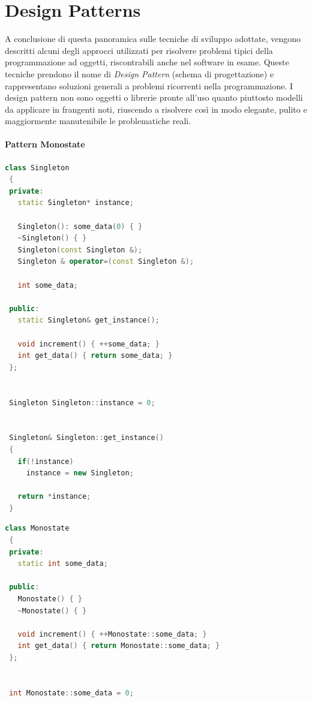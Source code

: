 \section{Design Patterns}
A conclusione di questa panoramica sulle tecniche di sviluppo adottate, vengono descritti alcuni degli approcci utilizzati per risolvere problemi tipici della programmazione ad oggetti, riscontrabili anche nel software in esame. Queste tecniche prendono il nome di \textit{Design Pattern} (schema di progettazione) e rappresentano soluzioni generali a problemi ricorrenti nella programmazione. I design pattern non sono oggetti o librerie pronte all'uso quanto piuttosto modelli da applicare in frangenti noti, riuscendo a risolvere così in modo elegante, pulito e maggiormente manutenibile le problematiche reali.

\paragraph{Pattern Monostate}

\begin{lstlisting}[basicstyle=\small,language=C++,caption={Pattern Singleton},float,label={lst:singleton},captionpos=b,frame=lines]
 class Singleton
 {
 private:
   static Singleton* instance;

   Singleton(): some_data(0) { }
   ~Singleton() { }
   Singleton(const Singleton &);
   Singleton & operator=(const Singleton &);

   int some_data;

 public:
   static Singleton& get_instance();

   void increment() { ++some_data; }
   int get_data() { return some_data; }
 };


 Singleton Singleton::instance = 0;


 Singleton& Singleton::get_instance()
 {
   if(!instance)
     instance = new Singleton;

   return *instance;
 }
\end{lstlisting}

\begin{lstlisting}[basicstyle=\small,language=C++,caption={Pattern Monostate},float,label={lst:monostate},captionpos=b,frame=lines]
 class Monostate
 {
 private:
   static int some_data;

 public:
   Monostate() { }
   ~Monostate() { } 

   void increment() { ++Monostate::some_data; }
   int get_data() { return Monostate::some_data; }
 };


 int Monostate::some_data = 0;
\end{lstlisting}

